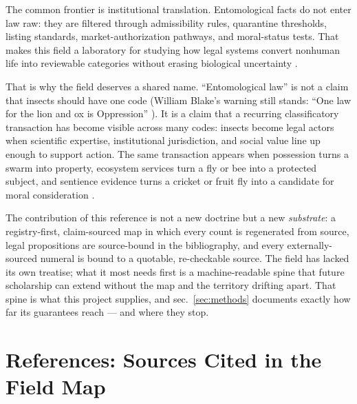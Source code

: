 \documentclass[
  english,
]{article}
\begin{document}
The common frontier is institutional translation. Entomological facts do
not enter law raw: they are filtered through admissibility rules,
quarantine thresholds, listing standards, market-authorization pathways,
and moral-status tests. That makes this field a laboratory for studying
how legal systems convert nonhuman life into reviewable categories
without erasing biological uncertainty
\citep{jasanoff2015serviceable, lodge2016bioeconomics_invasive_species, lugo2006insect_conservation_esa}.

That is why the field deserves a shared name. ``Entomological law'' is
not a claim that insects should have one code (William Blake's warning
still stands: ``One law for the lion and ox is Oppression''
\citep{blake1790_marriage}). It is a claim that a recurring
classificatory transaction has become visible across many codes: insects
become legal actors when scientific expertise, institutional
jurisdiction, and social value line up enough to support action. The
same transaction appears when possession turns a swarm into property,
ecosystem services turn a fly or bee into a protected subject, and
sentience evidence turns a cricket or fruit fly into a candidate for
moral consideration
\citep{rose1985possession_property, losey2006economic_value_insects, bowker1999sorting}.

The contribution of this reference is not a new doctrine but a new
\emph{substrate}: a registry-first, claim-sourced map in which every
count is regenerated from source, legal propositions are source-bound in
the bibliography, and every externally-sourced numeral is bound to a
quotable, re-checkable source. The field has lacked its own treatise;
what it most needs first is a machine-readable spine that future
scholarship can extend without the map and the territory drifting apart.
That spine is what this project supplies, and sec.~\ref{sec:methods}
documents exactly how far its guarantees reach --- and where they stop.

\newpage

\section{References: Sources Cited in the Field
Map}\label{sec:references}

\newpage



\providecommand{\bibsection}{}
\renewcommand{\bibsection}{}
\end{document}
